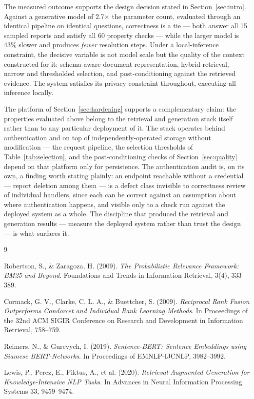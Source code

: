 \documentclass[12pt, a4paper]{article}
\begin{document}
The measured outcome supports the design decision stated in Section~\ref{sec:intro}. Against a generative model of 2.7$\times$ the parameter count, evaluated through an identical pipeline on identical questions, correctness is a tie --- both answer all 15 sampled reports and satisfy all 60 property checks --- while the larger model is 43\% slower and produces \emph{fewer} resolution steps. Under a local-inference constraint, the decisive variable is not model scale but the quality of the context constructed for it: schema-aware document representation, hybrid retrieval, narrow and thresholded selection, and post-conditioning against the retrieved evidence. The system satisfies its privacy constraint throughout, executing all inference locally.

The platform of Section~\ref{sec:hardening} supports a complementary claim: the properties evaluated above belong to the retrieval and generation stack itself rather than to any particular deployment of it. The stack operates behind authentication and on top of independently-operated storage without modification --- the request pipeline, the selection thresholds of Table~\ref{tab:selection}, and the post-conditioning checks of Section~\ref{sec:quality} depend on that platform only for persistence. The authentication audit is, on its own, a finding worth stating plainly: an endpoint reachable without a credential --- report deletion among them --- is a defect class invisible to correctness review of individual handlers, since each can be correct against an assumption about where authentication happens, and visible only to a check run against the deployed system as a whole. The discipline that produced the retrieval and generation results --- measure the deployed system rather than trust the design --- is what surfaces it.

\begin{thebibliography}{9}

Robertson, S., \& Zaragoza, H. (2009).
\textit{The Probabilistic Relevance Framework: BM25 and Beyond}.
Foundations and Trends in Information Retrieval, 3(4), 333--389.

Cormack, G. V., Clarke, C. L. A., \& Buettcher, S. (2009).
\textit{Reciprocal Rank Fusion Outperforms Condorcet and Individual Rank Learning Methods}.
In Proceedings of the 32nd ACM SIGIR Conference on Research and Development in Information Retrieval, 758--759.

Reimers, N., \& Gurevych, I. (2019).
\textit{Sentence-BERT: Sentence Embeddings using Siamese BERT-Networks}.
In Proceedings of EMNLP-IJCNLP, 3982--3992.

Lewis, P., Perez, E., Piktus, A., et al. (2020).
\textit{Retrieval-Augmented Generation for Knowledge-Intensive NLP Tasks}.
In Advances in Neural Information Processing Systems 33, 9459--9474.

\end{thebibliography}
\end{document}
